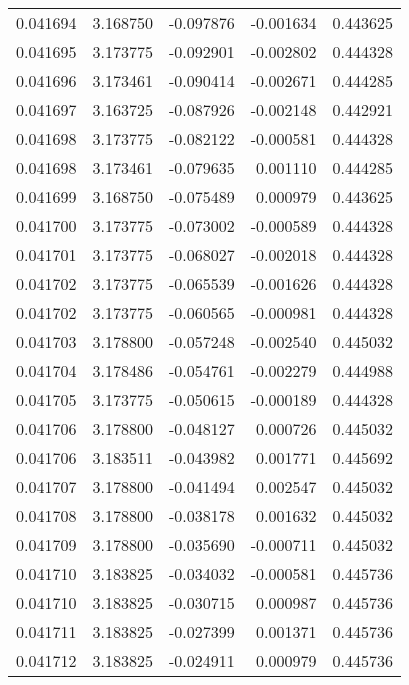 \begin{tabular}{lrrrr}
0.041694    &  3.168750 & -0.097876 & -0.001634 &             0.443625 \\
0.041695    &  3.173775 & -0.092901 & -0.002802 &             0.444328 \\
0.041696    &  3.173461 & -0.090414 & -0.002671 &             0.444285 \\
0.041697    &  3.163725 & -0.087926 & -0.002148 &             0.442921 \\
0.041698    &  3.173775 & -0.082122 & -0.000581 &             0.444328 \\
0.041698    &  3.173461 & -0.079635 &  0.001110 &             0.444285 \\
0.041699    &  3.168750 & -0.075489 &  0.000979 &             0.443625 \\
0.041700    &  3.173775 & -0.073002 & -0.000589 &             0.444328 \\
0.041701    &  3.173775 & -0.068027 & -0.002018 &             0.444328 \\
0.041702    &  3.173775 & -0.065539 & -0.001626 &             0.444328 \\
0.041702    &  3.173775 & -0.060565 & -0.000981 &             0.444328 \\
0.041703    &  3.178800 & -0.057248 & -0.002540 &             0.445032 \\
0.041704    &  3.178486 & -0.054761 & -0.002279 &             0.444988 \\
0.041705    &  3.173775 & -0.050615 & -0.000189 &             0.444328 \\
0.041706    &  3.178800 & -0.048127 &  0.000726 &             0.445032 \\
0.041706    &  3.183511 & -0.043982 &  0.001771 &             0.445692 \\
0.041707    &  3.178800 & -0.041494 &  0.002547 &             0.445032 \\
0.041708    &  3.178800 & -0.038178 &  0.001632 &             0.445032 \\
0.041709    &  3.178800 & -0.035690 & -0.000711 &             0.445032 \\
0.041710    &  3.183825 & -0.034032 & -0.000581 &             0.445736 \\
0.041710    &  3.183825 & -0.030715 &  0.000987 &             0.445736 \\
0.041711    &  3.183825 & -0.027399 &  0.001371 &             0.445736 \\
0.041712    &  3.183825 & -0.024911 &  0.000979 &             0.445736 \\

\end{tabular}
